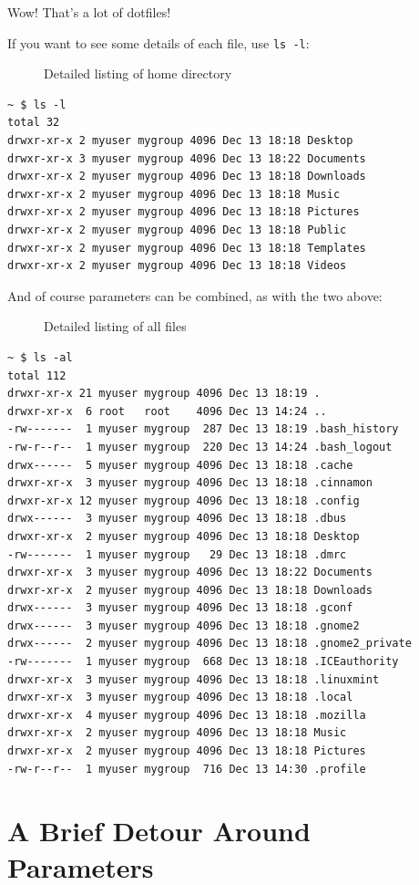 \documentclass[10pt,]{book}
\numberwithin{figure}{chapter}
\DeclareRobustCommand{\drcap}[1]{\begin{figure}[H]\caption{#1}\end{figure}}
\begin{document}
Wow! That's a lot of dotfiles!

If you want to see some details of each file, use \texttt{ls -l}:

\drcap{Detailed listing of home directory}

\begin{verbatim}
~ $ ls -l
total 32
drwxr-xr-x 2 myuser mygroup 4096 Dec 13 18:18 Desktop
drwxr-xr-x 3 myuser mygroup 4096 Dec 13 18:22 Documents
drwxr-xr-x 2 myuser mygroup 4096 Dec 13 18:18 Downloads
drwxr-xr-x 2 myuser mygroup 4096 Dec 13 18:18 Music
drwxr-xr-x 2 myuser mygroup 4096 Dec 13 18:18 Pictures
drwxr-xr-x 2 myuser mygroup 4096 Dec 13 18:18 Public
drwxr-xr-x 2 myuser mygroup 4096 Dec 13 18:18 Templates
drwxr-xr-x 2 myuser mygroup 4096 Dec 13 18:18 Videos
\end{verbatim}

And of course parameters can be combined, as with the two above:

\drcap{Detailed listing of all files}

\begin{verbatim}
~ $ ls -al
total 112
drwxr-xr-x 21 myuser mygroup 4096 Dec 13 18:19 .
drwxr-xr-x  6 root   root    4096 Dec 13 14:24 ..
-rw-------  1 myuser mygroup  287 Dec 13 18:19 .bash_history
-rw-r--r--  1 myuser mygroup  220 Dec 13 14:24 .bash_logout
drwx------  5 myuser mygroup 4096 Dec 13 18:18 .cache
drwxr-xr-x  3 myuser mygroup 4096 Dec 13 18:18 .cinnamon
drwxr-xr-x 12 myuser mygroup 4096 Dec 13 18:18 .config
drwx------  3 myuser mygroup 4096 Dec 13 18:18 .dbus
drwxr-xr-x  2 myuser mygroup 4096 Dec 13 18:18 Desktop
-rw-------  1 myuser mygroup   29 Dec 13 18:18 .dmrc
drwxr-xr-x  3 myuser mygroup 4096 Dec 13 18:22 Documents
drwxr-xr-x  2 myuser mygroup 4096 Dec 13 18:18 Downloads
drwx------  3 myuser mygroup 4096 Dec 13 18:18 .gconf
drwx------  3 myuser mygroup 4096 Dec 13 18:18 .gnome2
drwx------  2 myuser mygroup 4096 Dec 13 18:18 .gnome2_private
-rw-------  1 myuser mygroup  668 Dec 13 18:18 .ICEauthority
drwxr-xr-x  3 myuser mygroup 4096 Dec 13 18:18 .linuxmint
drwxr-xr-x  3 myuser mygroup 4096 Dec 13 18:18 .local
drwxr-xr-x  4 myuser mygroup 4096 Dec 13 18:18 .mozilla
drwxr-xr-x  2 myuser mygroup 4096 Dec 13 18:18 Music
drwxr-xr-x  2 myuser mygroup 4096 Dec 13 18:18 Pictures
-rw-r--r--  1 myuser mygroup  716 Dec 13 14:30 .profile
\end{verbatim}

\section*{A Brief Detour Around
Parameters}\label{a-brief-detour-around-parameters}
\end{document}
